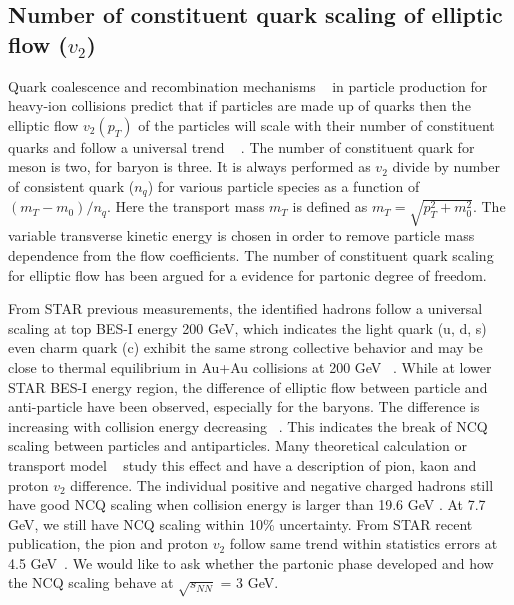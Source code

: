 \subsection{Number of constituent quark scaling of elliptic flow ($v_{2}$)}
Quark coalescence and recombination mechanisms ~\cite{Fries:2003vb,Hwa:2003bn} in particle production for heavy-ion collisions predict that if particles are made up of quarks then the elliptic flow $v_{2}(p_{T})$ of the particles will scale with their number of constituent quarks and follow a universal trend ~\cite{Molnar:2003ff} . The number of constituent quark for meson is two, for baryon is three. It is always performed as $v_{2}$ divide by number of consistent quark ($n_{q}$) for various particle species as a function of $(m_{T}-m_{0})/n_{q}$. Here the transport mass $m_{T}$ is defined as $m_{T} = \sqrt{p_{T}^{2}+m_{0}^{2}}$. The variable transverse kinetic energy is chosen in order to remove particle mass dependence from the flow coefficients.  The number of constituent quark scaling for elliptic flow has been argued for a evidence for partonic degree of freedom.

From STAR previous measurements, the identified hadrons follow a universal scaling at top BES-I energy 200 GeV, which indicates the light quark (u, d, s) even charm quark (c) exhibit the same strong collective behavior and may be close to thermal equilibrium in Au+Au collisions at 200 GeV ~\cite{Abelev:2008ae, Adamczyk:2015ukd, Adamczyk:2017xur}. While at lower STAR BES-I energy region, the difference of elliptic flow between particle and anti-particle have been observed, especially for the baryons. The difference is increasing with collision energy decreasing ~\cite{Adamczyk:2013gv}. This indicates the break of NCQ scaling between particles and antiparticles. Many theoretical calculation or transport model ~\cite{Dunlop:2011cf, Steinheimer:2012bn, Sun:2014rda, Hatta:2015era, Xu:2013sta} study this effect and have a description of pion, kaon and proton $v_{2}$ difference. The individual positive and negative charged hadrons still have good NCQ scaling when collision energy is larger than 19.6 GeV \cite{Adamczyk:2013gw}. At 7.7 GeV, we still have NCQ scaling within 10\% uncertainty. From STAR recent publication, the pion and proton $v_{2}$ follow same trend within statistics errors at 4.5 GeV~\cite{Adam:2020pla}. We would like to ask whether the partonic phase developed and how the NCQ scaling behave at $\sqrt{s_{NN}}$ = 3 GeV.


